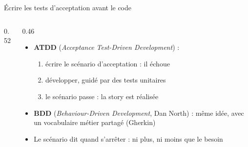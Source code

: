 \documentclass[aspectratio=169,10pt]{beamer}
\begin{document}
\begin{frame}{Écrire les tests d'acceptation avant le code}
  \begin{columns}[c]
    \begin{column}{0.52\textwidth}
      \begin{center}
      \end{center}
    \end{column}
    \begin{column}{0.46\textwidth}
      \begin{itemize}
        \item \textbf{ATDD} (\textit{Acceptance Test-Driven Development}) :
          \begin{enumerate}
            \item écrire le scénario d'acceptation : il échoue
            \item développer, guidé par des tests unitaires
            \item le scénario passe : la story est réalisée
          \end{enumerate}
        \item \textbf{BDD} (\textit{Behaviour-Driven Development}, Dan North) : même idée, avec un vocabulaire métier partagé (Gherkin)
        \item Le scénario dit \alert{quand s'arrêter} : ni plus, ni moins que le besoin
      \end{itemize}
    \end{column}
  \end{columns}
\end{frame}
\end{document}

